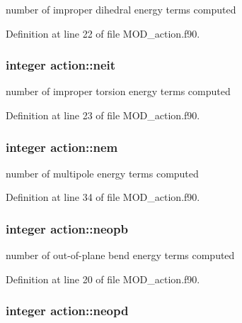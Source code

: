 number of improper dihedral energy terms computed 



Definition at line 22 of file M\-O\-D\-\_\-action.\-f90.

\hypertarget{classaction_a998c2a3a95f52e1c3250517858642607}{
\subsubsection[{neit}]{\setlength{\rightskip}{0pt plus 5cm}integer action\-::neit}}\label{classaction_a998c2a3a95f52e1c3250517858642607}


number of improper torsion energy terms computed 



Definition at line 23 of file M\-O\-D\-\_\-action.\-f90.

\hypertarget{classaction_a107acd2a8e9143fe6069329b50d29b86}{
\subsubsection[{nem}]{\setlength{\rightskip}{0pt plus 5cm}integer action\-::nem}}\label{classaction_a107acd2a8e9143fe6069329b50d29b86}


number of multipole energy terms computed 



Definition at line 34 of file M\-O\-D\-\_\-action.\-f90.

\hypertarget{classaction_a7bdab54cdcfeeecc02ccc52a6b12257c}{
\subsubsection[{neopb}]{\setlength{\rightskip}{0pt plus 5cm}integer action\-::neopb}}\label{classaction_a7bdab54cdcfeeecc02ccc52a6b12257c}


number of out-\/of-\/plane bend energy terms computed 



Definition at line 20 of file M\-O\-D\-\_\-action.\-f90.

\hypertarget{classaction_a783f4acdf51b44b4acfb9ce9222ea628}{
\subsubsection[{neopd}]{\setlength{\rightskip}{0pt plus 5cm}integer action\-::neopd}}\label{classaction_a783f4acdf51b44b4acfb9ce9222ea628}


